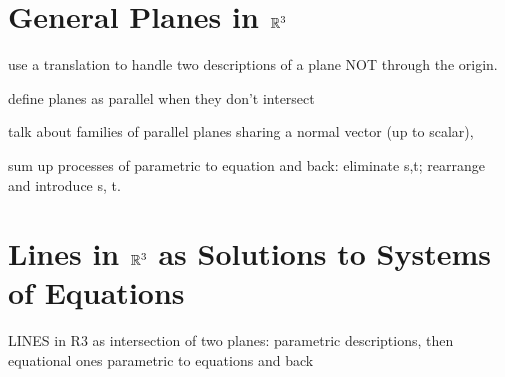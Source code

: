 \documentclass[00-livre-main.tex]{subfiles}
\begin{document}
\clearpage


\section*{General Planes in $\mathbb{R}^3$}

use a translation to handle two descriptions of a plane NOT through the origin.

define planes as parallel when they don't intersect

talk about families of parallel planes sharing a normal vector (up to scalar), 

sum up processes of parametric to equation and back: eliminate s,t; rearrange and introduce s, t.


\section*{Lines in $\mathbb{R}^3$ as Solutions to Systems of Equations}

LINES in R3 as intersection of two planes: parametric descriptions, then equational ones
parametric to equations and back
\end{document}
